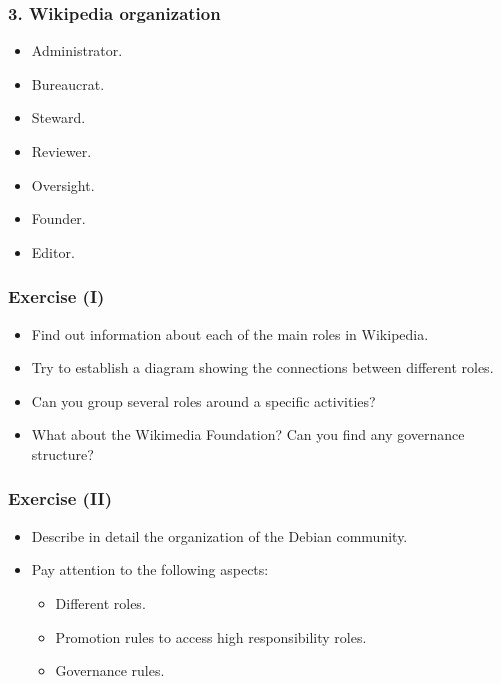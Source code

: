 \documentclass{beamer}
\begin{document}

\begin{frame}
 \frametitle{3. Wikipedia organization}
 \begin{itemize}
  \item Administrator.
  \item Bureaucrat.
  \item Steward.
  \item Reviewer.
  \item Oversight.
  \item Founder.
  \item Editor.
 \end{itemize}

\end{frame}


\begin{frame}
 \frametitle{Exercise (I)}
 \begin{itemize}
  \item Find out information about each of the main roles in Wikipedia.
  \item Try to establish a diagram showing the connections between different roles.
  \item Can you group several roles around a specific activities?
  \item What about the Wikimedia Foundation? Can you find any governance structure?
  \end{itemize}

\end{frame}


\begin{frame}
 \frametitle{Exercise (II)}
 \begin{itemize}
  \item Describe in detail the organization of the Debian community.
  \item Pay attention to the following aspects:
  \begin{itemize}
   \item Different roles.
   \item Promotion rules to access high responsibility roles.
   \item Governance rules.
  \end{itemize}

 \end{itemize}

\end{frame}
\end{document}

